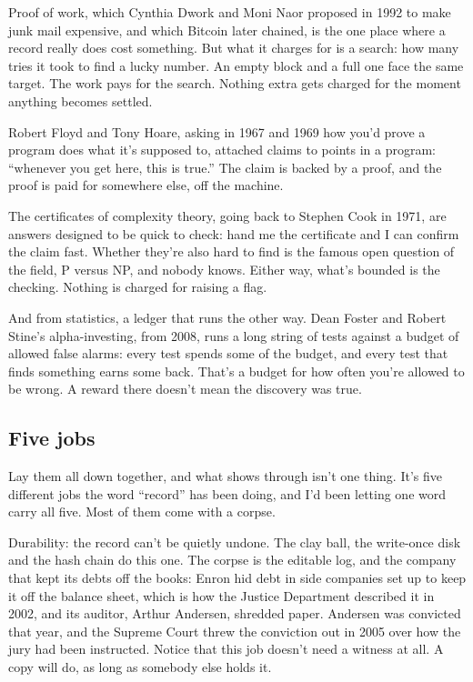 \documentclass[11pt,twoside]{article}
\theoremstyle{thielethm}
\theoremstyle{thieledef}
\theoremstyle{thieledef}
\theoremstyle{thieledef}
\theoremstyle{thielethm}
\theoremstyle{thieleobs}
\theoremstyle{thielethm}
\begin{document}
Proof of work, which Cynthia Dwork and Moni Naor proposed in 1992 to make junk mail expensive, and which Bitcoin later chained, is the one place where a record really does cost something. But what it charges for is a search: how many tries it took to find a lucky number. An empty block and a full one face the same target. The work pays for the search. Nothing extra gets charged for the moment anything becomes settled.

Robert Floyd and Tony Hoare, asking in 1967 and 1969 how you'd prove a program does what it's supposed to, attached claims to points in a program: ``whenever you get here, this is true.'' The claim is backed by a proof, and the proof is paid for somewhere else, off the machine.

The certificates of complexity theory, going back to Stephen Cook in 1971, are answers designed to be quick to check: hand me the certificate and I can confirm the claim fast. Whether they're also hard to find is the famous open question of the field, P versus NP, and nobody knows. Either way, what's bounded is the checking. Nothing is charged for raising a flag.

And from statistics, a ledger that runs the other way. Dean Foster and Robert Stine's alpha-investing, from 2008, runs a long string of tests against a budget of allowed false alarms: every test spends some of the budget, and every test that finds something earns some back. That's a budget for how often you're allowed to be wrong. A reward there doesn't mean the discovery was true.

\subsection{Five jobs}

Lay them all down together, and what shows through isn't one thing. It's five different jobs the word ``record'' has been doing, and I'd been letting one word carry all five. Most of them come with a corpse.

Durability: the record can't be quietly undone. The clay ball, the write-once disk and the hash chain do this one. The corpse is the editable log, and the company that kept its debts off the books: Enron hid debt in side companies set up to keep it off the balance sheet, which is how the Justice Department described it in 2002, and its auditor, Arthur Andersen, shredded paper. Andersen was convicted that year, and the Supreme Court threw the conviction out in 2005 over how the jury had been instructed. Notice that this job doesn't need a witness at all. A copy will do, as long as somebody else holds it.
\end{document}
